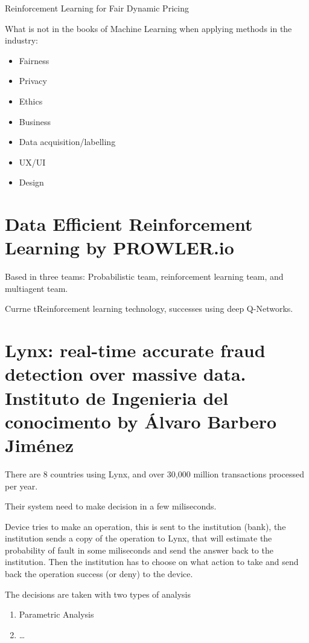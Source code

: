 \documentclass[b5paper]{report}
\begin{document}
Reinforcement Learning for Fair Dynamic Pricing \cite{maestre2018reinforcement}

What is not in the books of Machine Learning when applying methods in the
industry:

\begin{itemize}
  \item Fairness
  \item Privacy
  \item Ethics
  \item Business
  \item Data acquisition/labelling
  \item UX/UI
  \item Design
\end{itemize}

\section{Data Efficient Reinforcement Learning by PROWLER.io}

Based in three teams: Probabilistic team, reinforcement learning team, and multiagent team.

Currne tReinforcement learning technology, successes using deep Q-Networks.

\section{Lynx: real-time accurate fraud detection over massive data.
Instituto de Ingenieria del conocimento by Álvaro Barbero Jiménez}

There are 8 countries using Lynx, and over 30,000 million transactions
processed per year.

Their system need to make decision in a few miliseconds.

Device tries to make an operation, this is sent to the institution (bank), the
institution sends a copy of the operation to Lynx, that will estimate the
probability of fault in some miliseconds and send the answer back to the
institution. Then the institution has to choose on what action to take and send
back the operation success (or deny) to the device.

The decisions are taken with two types of analysis

\begin{enumerate}
  \item Parametric Analysis
  \item \dots
\end{enumerate}
\end{document}

